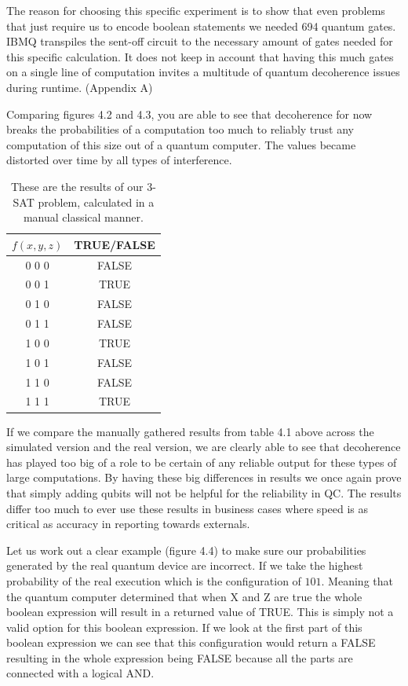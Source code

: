 The reason for choosing this specific experiment is to show that even problems that just require us to encode boolean statements we needed 694 quantum gates. IBMQ transpiles the sent-off circuit to the necessary amount of gates needed for this specific calculation. It does not keep in account that having this much gates on a single line of computation invites a multitude of quantum decoherence issues during runtime. (Appendix A)

Comparing figures 4.2 and 4.3, you are able to see that decoherence for now breaks the probabilities of a computation too much to reliably trust any computation of this size out of a quantum computer. The values became distorted over time by all types of interference.

\begin{table}
	\centering
	\begin{tabular}{|| c c ||}
		\hline
		$f(x,y,z)$ & TRUE/FALSE \\
		\hline\hline
		0 0 0 & FALSE \\ 
		0 0 1 & TRUE \\
		0 1 0 & FALSE \\
		0 1 1 & FALSE \\
		1 0 0 & TRUE \\
		1 0 1 & FALSE \\
		1 1 0 & FALSE \\
		1 1 1 & TRUE \\
		\hline
	\end{tabular}
\caption{These are the results of our 3-SAT problem, calculated in a manual classical manner.}
\end{table}

If we compare the manually gathered results from table 4.1 above across the simulated version and the real version, we are clearly able to see that decoherence has played too big of a role to be certain of any reliable output for these types of large computations. By having these big differences in results we once again prove that simply adding qubits will not be helpful for the reliability in QC. The results differ too much to ever use these results in business cases where speed is as critical as accuracy in reporting towards externals.

Let us work out a clear example (figure 4.4) to make sure our probabilities generated by the real quantum device are incorrect. If we take the highest probability of the real execution which is the configuration of $101$. Meaning that the quantum computer determined that when X and Z are true the whole boolean expression will result in a returned value of TRUE. This is simply not a valid option for this boolean expression. If we look at the first part of this boolean expression we can see that this configuration would return a FALSE resulting in the whole expression being FALSE because all the parts are connected with a logical AND. 

